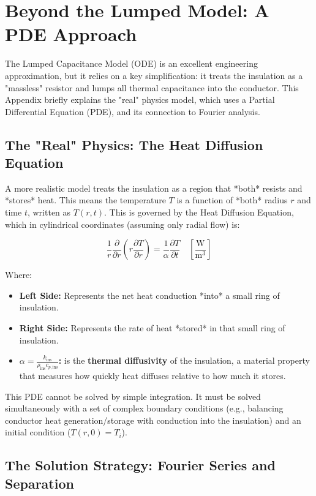 \documentclass[11pt, a4paper]{article}
\begin{document}
\section{Beyond the Lumped Model: A PDE Approach}

The Lumped Capacitance Model (ODE) is an excellent engineering approximation, but it relies on a key simplification: it treats the insulation as a "massless" resistor and lumps all thermal capacitance into the conductor. This Appendix briefly explains the "real" physics model, which uses a Partial Differential Equation (PDE), and its connection to Fourier analysis.

\subsection{The "Real" Physics: The Heat Diffusion Equation}
A more realistic model treats the insulation as a region that *both* resists and *stores* heat. This means the temperature $T$ is a function of *both* radius $r$ and time $t$, written as $T(r, t)$. This is governed by the Heat Diffusion Equation, which in cylindrical coordinates (assuming only radial flow) is:

\begin{equation}
    \frac{1}{r} \frac{\partial}{\partial r} \left( r \frac{\partial T}{\partial r} \right) = \frac{1}{\alpha} \frac{\partial T}{\partial t} \quad \left[ \frac{\si{\watt}}{\si{\cubic\metre}} \right]
\end{equation}

Where:
\begin{itemize}
    \item \textbf{Left Side:} Represents the net heat conduction *into* a small ring of insulation.
    \item \textbf{Right Side:} Represents the rate of heat *stored* in that small ring of insulation.
    \item \textbf{$\alpha = \frac{k_{\text{ins}}}{\rho_{\text{ins}} c_{p,\text{ins}}}$:} is the \textbf{thermal diffusivity} of the insulation, a material property that measures how quickly heat diffuses relative to how much it stores.
\end{itemize}

This PDE cannot be solved by simple integration. It must be solved simultaneously with a set of complex boundary conditions (e.g., balancing conductor heat generation/storage with conduction into the insulation) and an initial condition ($T(r, 0) = T_i$).

\subsection{The Solution Strategy: Fourier Series and Separation}
\end{document}
